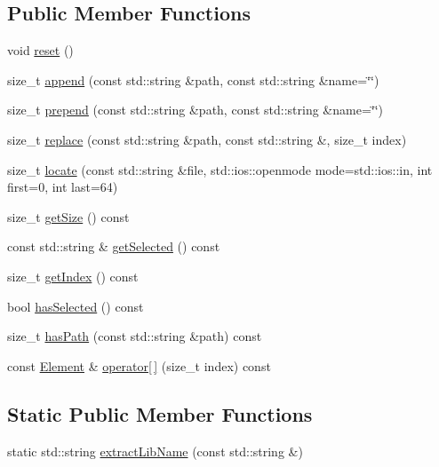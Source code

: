 \subsection*{Public Member Functions}
\begin{DoxyCompactItemize}
\item 
void \hyperlink{classCRL_1_1SearchPath_a7081332b63c642917b4ca15f665662f4}{reset} ()
\item 
size\-\_\-t \hyperlink{classCRL_1_1SearchPath_af358bdb1e940f08137f887f70eb641e3}{append} (const std\-::string \&path, const std\-::string \&name=\char`\"{}\char`\"{})
\item 
size\-\_\-t \hyperlink{classCRL_1_1SearchPath_af39d78a63d880e90ae6f947abf1fe322}{prepend} (const std\-::string \&path, const std\-::string \&name=\char`\"{}\char`\"{})
\item 
size\-\_\-t \hyperlink{classCRL_1_1SearchPath_a6cd1524e1048f246682cd5ef40145d67}{replace} (const std\-::string \&path, const std\-::string \&, size\-\_\-t index)
\item 
size\-\_\-t \hyperlink{classCRL_1_1SearchPath_af8e579af7e78dddb7a014d4bbbf9a36f}{locate} (const std\-::string \&file, std\-::ios\-::openmode mode=std\-::ios\-::in, int first=0, int last=64)
\item 
size\-\_\-t \hyperlink{classCRL_1_1SearchPath_a9ae41a1943fa287ccaf000a54edcd9dd}{get\-Size} () const 
\item 
const std\-::string \& \hyperlink{classCRL_1_1SearchPath_afe58fd540e54ccfb0b4b93604caee6e2}{get\-Selected} () const 
\item 
size\-\_\-t \hyperlink{classCRL_1_1SearchPath_ab07bf41af49374c4c59544aa008ddda6}{get\-Index} () const 
\item 
bool \hyperlink{classCRL_1_1SearchPath_a016b68705bfbeeddcfedb22c254aa511}{has\-Selected} () const 
\item 
size\-\_\-t \hyperlink{classCRL_1_1SearchPath_a6659535c41031e811a235494a6731f38}{has\-Path} (const std\-::string \&path) const 
\item 
const \hyperlink{classCRL_1_1SearchPath_1_1Element}{Element} \& \hyperlink{classCRL_1_1SearchPath_ab239552e9f81c9b5dda4e87b199c0fd0}{operator\mbox{[}$\,$\mbox{]}} (size\-\_\-t index) const 
\end{DoxyCompactItemize}
\subsection*{Static Public Member Functions}
\begin{DoxyCompactItemize}
\item 
static std\-::string \hyperlink{classCRL_1_1SearchPath_aef473ae1037c8cb792a3af02baea6fdc}{extract\-Lib\-Name} (const std\-::string \&)
\end{DoxyCompactItemize}


